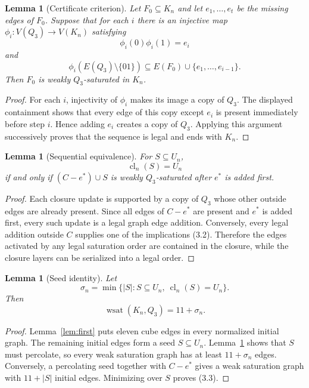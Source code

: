 \documentclass[11pt]{article}
\numberwithin{equation}{section}
\newtheorem{lemma}[theorem]{Lemma}
\newcommand{\wsat}{\operatorname{wsat}}
\newcommand{\cl}{\operatorname{cl}}
\begin{document}
\begin{lemma}[Certificate criterion]\label{lem:certificate}
Let $F_0\subseteq K_n$ and let $e_1,\ldots,e_t$ be the missing edges of $F_0$. Suppose that for each $i$ there is an injective map $\phi_i:V(Q_3)\to V(K_n)$ satisfying
\[
\phi_i(0)\phi_i(1)=e_i
\]
and
\[
\phi_i(E(Q_3)\setminus\{01\})\subseteq E(F_0)\cup\{e_1,\ldots,e_{i-1}\}.
\]
Then $F_0$ is weakly $Q_3$-saturated in $K_n$.
\end{lemma}

\begin{proof}
For each $i$, injectivity of $\phi_i$ makes its image a copy of $Q_3$. The displayed containment shows that every edge of this copy except $e_i$ is present immediately before step $i$. Hence adding $e_i$ creates a copy of $Q_3$. Applying this argument successively proves that the sequence is legal and ends with $K_n$.
\end{proof}

\begin{lemma}[Sequential equivalence]\label{lem:seq}
For $S\subseteq U_n$,
\[
\cl_n(S)=U_n
\]
if and only if $(C-e^*)\cup S$ is weakly $Q_3$-saturated after $e^*$ is added first.
\end{lemma}

\begin{proof}
Each closure update is supported by a copy of $Q_3$ whose other outside edges are already present. Since all edges of $C-e^*$ are present and $e^*$ is added first, every such update is a legal graph edge addition. Conversely, every legal addition outside $C$ supplies one of the implications (3.2). Therefore the edges activated by any legal saturation order are contained in the closure, while the closure layers can be serialized into a legal order.
\end{proof}

\begin{lemma}[Seed identity]\label{lem:seed}
Let
\[
\sigma_n=\min\{|S|:S\subseteq U_n,\ \cl_n(S)=U_n\}.
\]
Then
\[
\boxed{\wsat(K_n,Q_3)=11+\sigma_n.}
\tag{3.3}
\]
\end{lemma}

\begin{proof}
Lemma~\ref{lem:first} puts eleven cube edges in every normalized initial graph. The remaining initial edges form a seed $S\subseteq U_n$. Lemma~\ref{lem:seq} shows that $S$ must percolate, so every weak saturation graph has at least $11+\sigma_n$ edges. Conversely, a percolating seed together with $C-e^*$ gives a weak saturation graph with $11+|S|$ initial edges. Minimizing over $S$ proves (3.3).
\end{proof}
\end{document}
